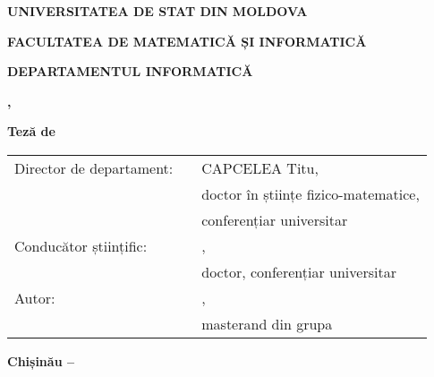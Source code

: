 \sloppy

\begin{titlepage}
  \vspace*{\fill}
  \begin{center}
      \vspace*{1cm}

      \large
      \uppercase{\textbf{UNIVERSITATEA DE STAT DIN MOLDOVA\\}}

      \normalsize
      \uppercase{\textbf{FACULTATEA DE MATEMATICĂ și INFORMATICĂ}}
      \vspace{0.1cm}

      \normalsize
      \uppercase{\textbf{DEPARTAMENTUL INFORMATICĂ}}
      \vspace{3.0cm}

      \large
      \textbf{\correctName{\authorName}}
      \vspace{1.5cm}

      \Large
      \textbf{\MakeUppercase{\thesisTitle}}
      \vspace{0.75cm}

      \large
      \textbf{\MakeUppercase{\identificatorulCursului}, \programulDeStudii}
      \vspace{0.5cm}

      \normalsize
      \textbf{Teză de \thesisType}
  
    \end{center}
  \vfill

  \normalsize
  
  \begin{flushleft}
    \newcommand{\signatureField}{\textUnderLine{4cm}{(semnătură)}}

    \begin{tabular}{p{4.3cm} p{4cm} p{8cm}}
      Director de departament: & \signatureField{} & CAPCELEA Titu, \\
                               &                   & doctor în științe fizico-matematice, \\
                               &                   & conferențiar universitar \\
      Conducător științific:   & \signatureField{} & \correctName{\conducatorName}, \\
                               &                   & doctor, conferențiar universitar \\
      Autor:                   & \signatureField{} & \correctName{\authorName}, \\
                               &                   & masterand din grupa \uniGroupName{} \\
    \end{tabular}
      
  \end{flushleft}

  \vspace{1cm}

  \begin{center}
      \textbf{Chișinău -- \year{}}
  \end{center}

\end{titlepage}
